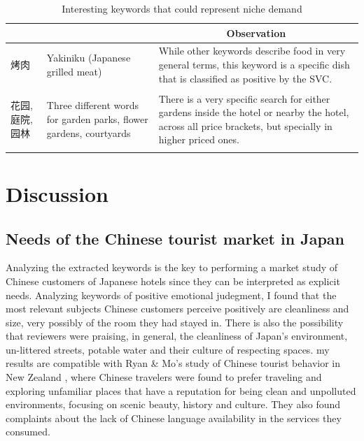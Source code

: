 \documentclass[review]{elsarticle}
\begin{document}
\begin{table}[!bph] \centering
\caption{Interesting keywords that could represent niche demand}
\label{tab:keys_niche}
\begin{tabular}{|>{\centering\arraybackslash}m{2.5em}|>{\raggedright\arraybackslash}m{9em}|m{16em}|} \hline
\multicolumn{1}{|c|}{\textbf{Word}} & \multicolumn{1}{c|}{\textbf{Translation}} & \multicolumn{1}{c|}{\textbf{Observation}} \\ \hline

\begin{CJK}{UTF8}{gbsn} 烤肉 \end{CJK} 
    & Yakiniku (Japanese grilled meat) & While other keywords describe food in very general terms, this keyword is a specific dish that is classified as positive by the SVC. \\ \hline

\begin{CJK}{UTF8}{gbsn} 花园, 庭院, 园林 \end{CJK} 
    & Three different words for garden parks, flower gardens, courtyards & There is a very specific search for either gardens inside the hotel or nearby the hotel, across all price brackets, but specially in higher priced ones. \\ \hline
\end{tabular}
\end{table}

\section{Discussion}\label{discussion}

\subsection{Needs of the Chinese tourist market in Japan}\label{discussionneeds}

Analyzing the extracted keywords is the key to performing a market study of Chinese customers of Japanese hotels since they can be interpreted as explicit needs. Analyzing keywords of positive emotional judegment, I found that the most relevant subjects Chinese customers perceive positively are cleanliness and size, very possibly of the room they had stayed in. There is also the possibility that reviewers were praising, in general, the cleanliness of Japan’s environment, un-littered streets, potable water and their culture of respecting spaces. my results are compatible with Ryan \& Mo’s study of Chinese tourist behavior in New Zealand \cite{ryan2001}, where Chinese travelers were found to prefer traveling and exploring unfamiliar places that have a reputation for being clean and unpolluted environments, focusing on scenic beauty, history and culture. They also found complaints about the lack of Chinese language availability in the services they consumed.
\end{document}
